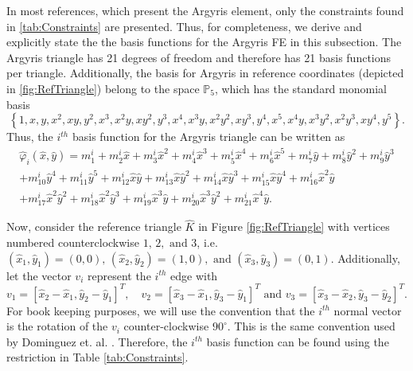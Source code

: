

In most references, which present the Argyris element, only the constraints
found in \autoref{tab:Constraints} are presented. Thus, for completeness, we
derive and explicitly state the the basis functions for the Argyris FE in this
subsection. The Argyris triangle has 21 degrees of freedom and therefore has 21
basis functions per triangle.  Additionally, the basis for Argyris in reference
coordinates (depicted in \autoref{fig:RefTriangle}) belong to the space
$\mathbb{P}_5$, which has the standard monomial basis
\begin{equation*}
	\left\{
    1, x, y, x^2, xy, y^2, x^3, x^2y, xy^2, y^3, x^4, x^3y,
    x^2y^2, xy^3, y^4, x^5, x^4y, x^3y^2, x^2y^3, xy^4, y^5
  \right\}.
\end{equation*}
Thus, the $i^{th}$ basis function for the Argyris triangle can be written as
\begin{equation}
	\begin{split}
	\hat{\varphi}_i(\hat{x},\hat{y}) = m^i_1 + m^i_2 \hat{x} + m^i_3 \hat{x}^2 + m^i_4 \hat{x}^3 + m^i_5 \hat{x}^4 + m^i_6 \hat{x}^5 + m^i_7 \hat{y} + m^i_8
 	\hat{y}^2 + m^i_9 \hat{y}^3 \\
 + m^i_{10} \hat{y}^4 + m^i_{11} \hat{y}^5 + m^i_{12}  \hat{x} \hat{y} + m^i_{13} \hat{x} \hat{y}^2 + m^i_{14} \hat{x} \hat{y}^3 + m^i_{15}
 	\hat{x} \hat{y}^4 + m^i_{16} \hat{x}^2 \hat{y} \\
 + m^i_{17} \hat{x}^2 \hat{y}^2 + m^i_{18}\hat{x}^2 \hat{y}^3 + m^i_{19} \hat{x}^3 \hat{y} + m^i_{20}\hat{x}^3 \hat{y}^2 + m^i_{21} \hat{x}^4 \hat{y}.
 \end{split}
	\label{eqn:Basis}
\end{equation}

Now, consider the reference triangle $\hat{K}$ in Figure \ref{fig:RefTriangle} with
vertices numbered counterclockwise $1,\, 2,\text{ and } 3$, i.e.
$(\hat{x}_1,\hat{y}_1)=(0,0),\, (\hat{x}_2,\hat{y}_2)=(1,0),\text{ and } (\hat{x}_3,\hat{y}_3)=(0,1)$.
Additionally, let the vector $v_i$ represent the $i^{th}$ edge with
\begin{equation*}
  v_1 = [\hat{x}_2-\hat{x}_1,\hat{y}_2-\hat{y}_1]^T, \quad v_2=[\hat{x}_3-\hat{x}_1,\hat{y}_3-\hat{y}_1]^T \text{ and } v_3=[\hat{x}_3
  -\hat{x}_2,\hat{y}_3-\hat{y}_2]^T.
\end{equation*}
For book keeping purposes, we will use the convention that the $i^{th}$ normal
vector is the rotation of the $v_i$ counter-clockwise $90^\circ$. This is the
same convention used by Dominguez et. al. \cite{Dominguez08}. Therefore, the
$i^{th}$ basis function can be found using the restriction in Table
\ref{tab:Constraints}.

